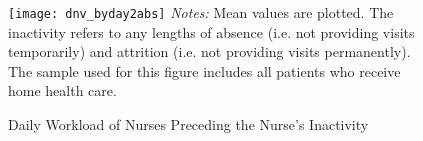 \documentclass[final,12pt, notitlepage]{article}
\begin{document}
\begin{singlespace}
\newpage
\begin{figure}[H]
\begin{minipage}{\linewidth}
\centering
\texttt{[image: dnv\_byday2abs]}
\footnotesize
\justify
\emph{Notes:} Mean values are plotted.
The inactivity refers to any lengths of absence (i.e. not providing visits temporarily) and attrition (i.e. not providing visits permanently).
The sample used for this figure includes all patients who receive home health care.
\end{minipage}
\caption{Daily Workload of Nurses Preceding the Nurse's Inactivity}
\label{fig:dnv_byday2abs}
\end{figure}

%


\end{singlespace}
\end{document}
